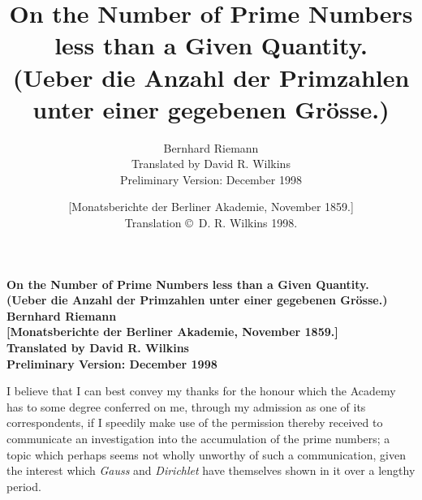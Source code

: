 \documentclass[a4paper,12pt]{article}
\begin{document}
\thispagestyle{empty}
\begin{center}
\Large\bfseries
On the Number of Prime Numbers less than a Given Quantity.\\[6 pt]
(Ueber die Anzahl der Primzahlen unter einer gegebenen Gr\"{o}sse.)\\[12 pt]
Bernhard Riemann\\[12 pt]
[Monatsberichte der Berliner Akademie, November 1859.]\\[12 pt]
Translated by David R. Wilkins\\[24 pt]
\large\mdseries
Preliminary Version: December 1998
\end{center}

\newpage
\setcounter{page}{1}


\title{On the Number of Prime Numbers less than a Given Quantity.\\
(Ueber die Anzahl der Primzahlen unter einer gegebenen Gr\"{o}sse.)}
\author{Bernhard Riemann\\
Translated by David R. Wilkins\\
Preliminary Version: December 1998}
\date{[Monatsberichte der Berliner Akademie, November 1859.]\\
Translation \copyright\ D. R. Wilkins 1998.}

\maketitle

I believe that I can best convey my thanks for the honour which
the Academy has to some degree conferred on me, through my
admission as one of its correspondents, if I speedily make use of
the permission thereby received to communicate an investigation
into the accumulation of the prime numbers; a topic which perhaps
seems not wholly unworthy of such a communication, given the
interest which \emph{Gauss} and \emph{Dirichlet} have
themselves shown in it over a lengthy period.
\end{document}
